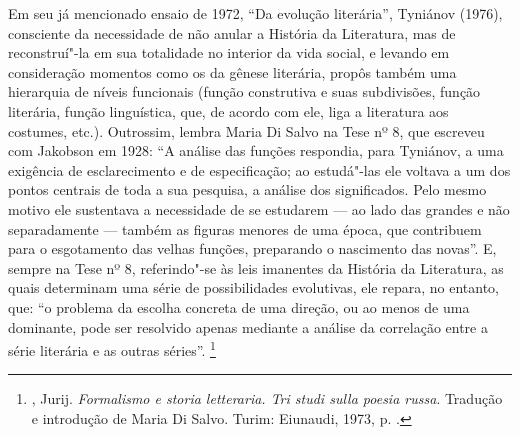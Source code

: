 {{{Em seu já mencionado ensaio de 1972, ``Da evolução literária'', Tyniánov (1976),
consciente da necessidade de não anular a História da
Literatura, mas de reconstruí"-la em sua totalidade no interior da vida
social, e levando em consideração momentos como os da gênese literária,
propôs também uma hierarquia de níveis funcionais (função construtiva e
suas subdivisões, função literária, função linguística, que, de acordo
com ele, liga a literatura aos costumes, etc.). Outrossim, lembra Maria Di
Salvo na Tese nº 8, que escreveu com Jakobson em 1928: ``A análise das funções respondia, para Tyniánov, a
uma exigência de esclarecimento e de especificação; ao estudá"-las ele
voltava a um dos pontos centrais de toda a sua pesquisa, a análise dos
significados. Pelo mesmo motivo ele sustentava a necessidade de se
estudarem --- ao lado das grandes e não separadamente --- também as figuras
menores de uma época, que contribuem para o esgotamento das velhas
funções, preparando o nascimento das novas''. E, sempre na Tese nº 8,
referindo"-se às leis imanentes da História da Literatura, as quais determinam
uma série de possibilidades evolutivas, ele repara, no entanto, que: ``o
problema da escolha concreta de uma direção, ou ao menos de uma
dominante, pode ser resolvido apenas mediante a análise da correlação
entre a série literária e as outras séries''.
\footnote{, Jurij. \emph{Formalismo e
 storia letteraria. Tri studi sulla poesia russa}. Tradução e introdução de Maria Di Salvo. Turim: Eiunaudi, 1973, p. .}

}}}
